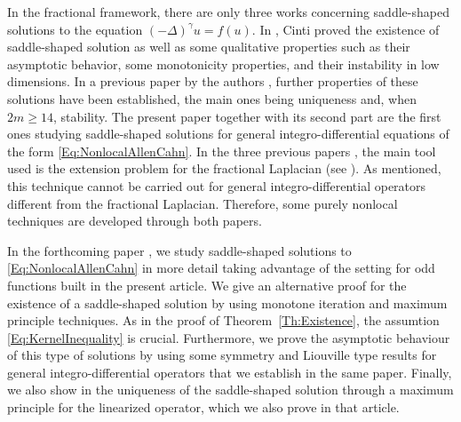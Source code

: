 \documentclass[12pt,reqno]{amsart}
\theoremstyle{definition}
\theoremstyle{remark}
\newcommand{\s}{\gamma}
\newcommand{\fraclaplacian}{(-\Delta)^\s}
\numberwithin{equation}{section}
\begin{document}
	In the fractional framework, there are only three works concerning saddle-shaped solutions to the equation $\fraclaplacian u = f(u)$. In \cite{Cinti-Saddle,Cinti-Saddle2}, Cinti proved the existence of saddle-shaped solution as well as some qualitative properties such as their asymptotic behavior, some monotonicity properties, and their instability in low dimensions. In a previous paper by the authors \cite{Felipe-Sanz-Perela:SaddleFractional}, further properties of these solutions have been established, the main ones being uniqueness and, when $2m\geq 14$, stability. The present paper together with its second part \cite{FelipeSanz-Perela:IntegroDifferentialII} are the first ones studying saddle-shaped solutions for general integro-differential equations of the form \eqref{Eq:NonlocalAllenCahn}. In the three previous papers \cite{Cinti-Saddle, Cinti-Saddle2, Felipe-Sanz-Perela:SaddleFractional}, the main tool used is the extension problem for the fractional Laplacian (see \cite{CaffarelliSilvestre}). As mentioned, this technique cannot be carried out for general integro-differential operators different from the fractional Laplacian. Therefore, some purely nonlocal techniques are developed through both papers.
	
	In the forthcoming paper \cite{FelipeSanz-Perela:IntegroDifferentialII}, we study saddle-shaped solutions to \eqref{Eq:NonlocalAllenCahn} in more detail taking advantage of the setting for odd functions built in the present article. We give an alternative proof for the existence of a saddle-shaped solution by using monotone iteration and maximum principle techniques. As in the proof of Theorem~\ref{Th:Existence}, the assumtion \eqref{Eq:KernelInequality} is crucial. Furthermore, we prove the asymptotic behaviour of this type of solutions by using some symmetry and Liouville type results for general integro-differential operators that we establish in the same paper. Finally, we also show in \cite{FelipeSanz-Perela:IntegroDifferentialII} the uniqueness of the saddle-shaped solution through a maximum principle for the linearized operator, which we also prove in that article.
	
\end{document}
